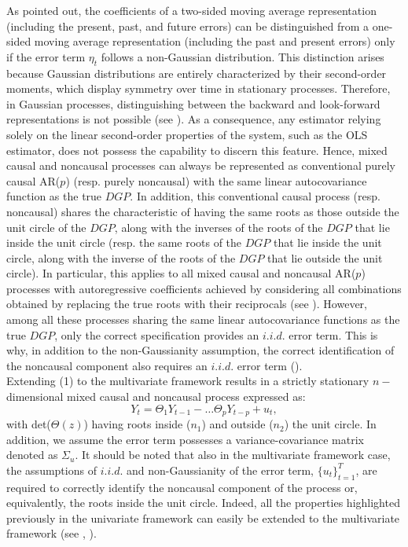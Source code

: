 \documentclass[<1p>]{elsarticle} %
\begin{document}
\indent As \cite{findley1986uniqueness} pointed out, the coefficients of a two-sided moving average representation (including the present, past, and future errors) can be distinguished from a one-sided moving average representation (including the past and present errors) only if the error term $\eta_t$ follows a non-Gaussian distribution. This distinction arises because Gaussian distributions are entirely characterized by their second-order moments, which display symmetry over time in stationary processes. Therefore, in Gaussian processes, distinguishing between the backward and look-forward representations is not possible (see \cite{giancaterini2022climate}). As a consequence, any estimator relying solely on the linear second-order properties of the system, such as the OLS estimator, does not possess the capability to discern this feature. Hence, mixed causal and noncausal processes can always be represented as conventional purely causal AR($p$) (resp. purely noncausal) with the same linear autocovariance function as the true $DGP$. In addition, this conventional causal process (resp. noncausal) shares the characteristic of having the same roots as those outside the unit circle of the $DGP$, along with the inverses of the roots of the $DGP$ that lie inside the unit circle (resp. the same roots of the $DGP$ that lie inside the unit circle, along with the inverse of the roots of the $DGP$ that lie outside the unit circle).  In particular, this applies to all mixed causal and noncausal AR($p$) processes with autoregressive coefficients achieved by considering all combinations obtained by replacing the true roots with their reciprocals (see \cite{breidt1991maximum}). However, among all these processes sharing the same linear autocovariance functions as the true $DGP$, only the correct specification provides an $i.i.d.$ error term. This is why, in addition to the non-Gaussianity assumption, the correct identification of the noncausal component also requires an $i.i.d.$ error term (\cite{hecq2016identification}).\\
\indent Extending (1) to the multivariate framework results in a strictly stationary $n-$dimensional mixed causal and noncausal process expressed as:
\begin{equation}
    Y_t=\Theta_1 Y_{t-1}- \dots \Theta_p Y_{t-p}+u_t,
\end{equation} 
with det($\Theta (z)$) having roots inside ($n_1$) and outside ($n_2$) the unit circle. In addition, we assume the error term possesses a variance-covariance matrix denoted as $\Sigma_u$. It should be noted that also in the multivariate framework case, the assumptions of $i.i.d.$ and non-Gaussianity of the error term, $\{ u_t \}_{t=1}^{T}$, are required to correctly identify the noncausal component of the process or, equivalently, the roots inside the unit circle. Indeed, all the properties highlighted previously in the univariate framework can easily be extended to the multivariate framework (see \cite{davis2020noncausal}, \cite{gourieroux2017noncausal}).\\
\end{document}
